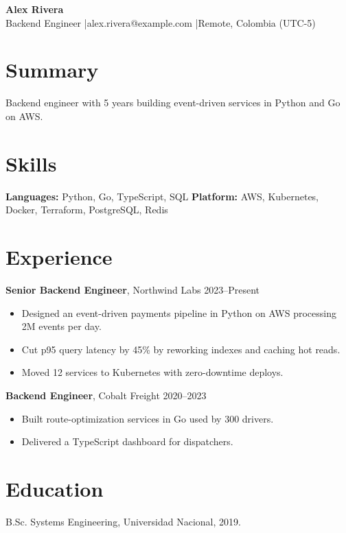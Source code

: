 \documentclass[a4paper,10pt]{article}
\begin{document}
{\LARGE\bfseries Alex Rivera}\\
Backend Engineer \quad|\quad alex.rivera@example.com \quad|\quad Remote, Colombia (UTC-5)

\section*{Summary}
Backend engineer with 5 years building event-driven services in Python and Go on AWS.

\section*{Skills}
\textbf{Languages:} Python, Go, TypeScript, SQL
\textbf{Platform:} AWS, Kubernetes, Docker, Terraform, PostgreSQL, Redis

\section*{Experience}
\textbf{Senior Backend Engineer}, Northwind Labs \hfill 2023--Present
\begin{itemize}
\item Designed an event-driven payments pipeline in Python on AWS processing 2M events per day.
\item Cut p95 query latency by 45\% by reworking indexes and caching hot reads.
\item Moved 12 services to Kubernetes with zero-downtime deploys.
\end{itemize}
\textbf{Backend Engineer}, Cobalt Freight \hfill 2020--2023
\begin{itemize}
\item Built route-optimization services in Go used by 300 drivers.
\item Delivered a TypeScript dashboard for dispatchers.
\end{itemize}

\section*{Education}
B.Sc. Systems Engineering, Universidad Nacional, 2019.
\end{document}
